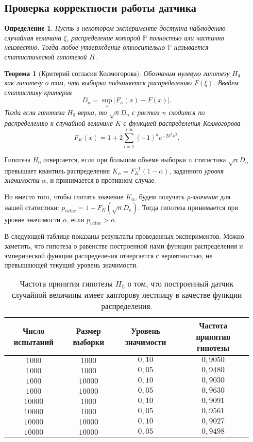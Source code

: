 \documentclass[a4paper, 11pt]{article}
\theoremstyle{def}
\newtheorem{definition}{Определение}[section]
\theoremstyle{th}
\newtheorem{theorem}{Теорема}[section]
\theoremstyle{rem}
\newcommand{\p}{\mathbb{P}}
\begin{document}
\subsection{Проверка корректности работы датчика}
\begin{definition}
        Пусть в некотором эксперименте доступна наблюдению случайная величина $\xi$, распределение которой $\p$ полностью или частично неизвестно. Тогда любое утверждение относительно $\p$ называется \textit{статистической гипотезой} $H$.
\end{definition}
\begin{theorem}[Критерий согласия Колмогорова]
        Обозначим нулевую гипотезу $H_0$ как гипотезу о том, что выборка подчиняется распределению $F(\xi)$. Введем статистику критерия
$$
        D_n = \sup\limits_{x}|F_n(x) - F(x)|.
$$
        Тогда если гипотеза $H_0$ верна, то $\sqrt{n}D_n$ с ростом $n$ сходится по распределению к случайной величине $K$ с функцией распределения Колмогорова
$$
        F_K(x) = 1 + 2\sum_{i = 1}^{+\infty} (-1)^k e^{-2k^2x^2}.
$$
\end{theorem}

Гипотеза $H_0$ отвергается, если при большом объеме выборки $n$ статистика $\sqrt{n}D_n$ превышает квантиль распределения $K_\alpha =  F_K^{-1}(1 - \alpha)$, заданного \textit{уровня значимости } $\alpha$, и принимается в противном случае.

Но вместо того, чтобы считать значение $K_{\alpha}$, будем получать \textit{p-значение} для нашей статистики: $p_{value} = 1 - F_K(\sqrt{n}D_n)$. Тогда гипотеза принимается при уровне значимости $\alpha$, если $p_{value} > \alpha$.

В следующей таблице показаны результаты проведенных экспериментов. Можно заметить, что гипотеза о равенстве построенной нами функции распределения и эмперической функции распределения отвергается с вероятностью, не превышающей текущий уровень значимости.

\begin{table}[h]
\begin{center}
\begin{tabular}{|c|c|c|c|}
\hline
Число испытаний &
Размер выборки  &
Уровень значимости &
Частота принятия гипотезы
\\
\hline
$1000$
&
$1000$
&
$0,10$
&
$0,9050$
\\
\hline
$1000$
&
$1000$
&
$0,05$
&
$0,9480$
\\
\hline
$1000$
&
$10000$
&
$0,10$
&
$0,9030$
\\
\hline
$1000$
&
$10000$
&
$0,05$
&
$0,9630$
\\
\hline
$10000$
&
$1000$
&
$0,10$
&
$0,9091$
\\
\hline
$10000$
&
$1000$
&
$0,05$
&
$0,9561$
\\
\hline
$10000$
&
$10000$
&
$0,10$
&
$0,9027$
\\
\hline
$10000$
&
$10000$
&
$0,05$
&
$0,9498$
\\
\hline
\end{tabular}
\end{center}
\caption{Частота принятия гипотезы $H_0$ о том, что построенный датчик случайной величины имеет канторову лестницу в качестве функции распределения.}
\end{table}
\end{document}

